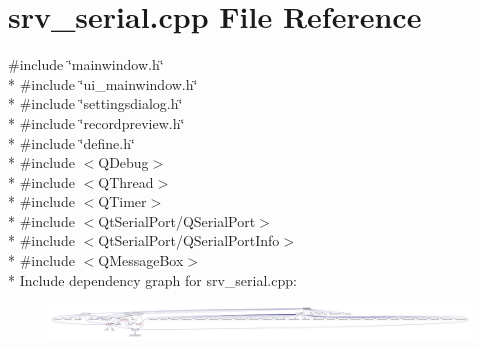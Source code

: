 \hypertarget{a00050}{\section{srv\+\_\+serial.\+cpp File Reference}
\label{a00050}
}
{\ttfamily \#include \char`\"{}mainwindow.\+h\char`\"{}}\\*
{\ttfamily \#include \char`\"{}ui\+\_\+mainwindow.\+h\char`\"{}}\\*
{\ttfamily \#include \char`\"{}settingsdialog.\+h\char`\"{}}\\*
{\ttfamily \#include \char`\"{}recordpreview.\+h\char`\"{}}\\*
{\ttfamily \#include \char`\"{}define.\+h\char`\"{}}\\*
{\ttfamily \#include $<$Q\+Debug$>$}\\*
{\ttfamily \#include $<$Q\+Thread$>$}\\*
{\ttfamily \#include $<$Q\+Timer$>$}\\*
{\ttfamily \#include $<$Qt\+Serial\+Port/\+Q\+Serial\+Port$>$}\\*
{\ttfamily \#include $<$Qt\+Serial\+Port/\+Q\+Serial\+Port\+Info$>$}\\*
{\ttfamily \#include $<$Q\+Message\+Box$>$}\\*
Include dependency graph for srv\+\_\+serial.\+cpp\+:
\nopagebreak
\begin{figure}[H]
\begin{center}
\leavevmode
\includegraphics[width=350pt]{dd/ded/a00211}
\end{center}
\end{figure}
